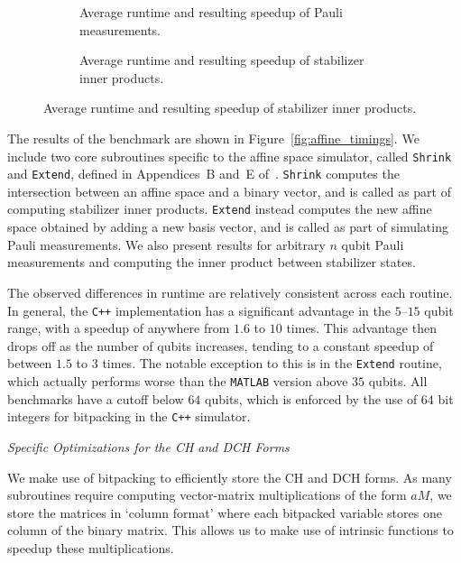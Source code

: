 \begin{figure}[p]\ContinuedFloat
\begin{subfigure}[t]{0.9\textwidth}
    \begin{scaletikzpicturetowidth}{\textwidth}
        
    \end{scaletikzpicturetowidth}
    \caption{Average runtime and resulting speedup of Pauli measurements.}
\end{subfigure}
\begin{subfigure}[t]{0.9\textwidth}
    \caption{Average runtime and resulting speedup of stabilizer inner products.}
    \begin{scaletikzpicturetowidth}{\textwidth}
        
    \end{scaletikzpicturetowidth}
\end{subfigure}
\end{figure}
The results of the benchmark are shown in Figure~\ref{fig:affine_timings}. We include two core subroutines specific to the affine space simulator, called \texttt{Shrink} and \texttt{Extend}, defined in Appendices~B and~E of~\cite{Bravyi2016}. \texttt{Shrink} computes the intersection between an affine space and a binary vector, and is called as part of computing stabilizer inner products. \texttt{Extend} instead computes the new affine space obtained by adding a new basis vector, and is called as part of simulating Pauli measurements. We also present results for arbitrary $n$ qubit Pauli measurements and computing the inner product between stabilizer states.\par
The observed differences in runtime are relatively consistent across each routine. In general, the \texttt{C++} implementation has a significant advantage in the $5$--$15$ qubit range, with a speedup of anywhere from $1.6$ to $10$ times. This advantage then drops off as the number of qubits increases, tending to a constant speedup of between $1.5$ to $3$ times. The notable exception to this is in the \texttt{Extend} routine, which actually performs worse than the \texttt{MATLAB} version above $35$ qubits. All benchmarks have a cutoff below $64$ qubits, which is enforced by the use of $64$ bit integers for bitpacking in the \texttt{C++} simulator.
\par
\large{\itshape{Specific Optimizations for the CH and DCH Forms}}\par
We make use of bitpacking to efficiently store the CH and DCH forms. As many subroutines require computing vector-matrix multiplications of the form $aM$, we store the matrices in `column format' where each bitpacked variable stores one column of the binary matrix. This allows us to make use of intrinsic functions to speedup these multiplications.\par

